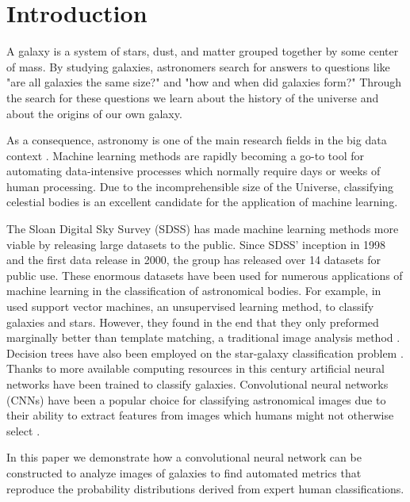 \section{Introduction}


A galaxy is a system of stars, dust, and matter grouped together by some center of mass. By studying galaxies, astronomers search for answers to questions like "are all galaxies the same size?" and "how and when did galaxies form?" Through the search for these questions we learn about the history of the universe and about the origins of our own galaxy.


As a consequence, astronomy is one of the main research fields in the big data context \cite{microsoft-galaxies}. Machine learning methods are rapidly becoming a go-to tool for automating data-intensive processes which normally require days or weeks of human processing. Due to the incomprehensible size of the Universe, classifying celestial bodies is an excellent candidate for the application of machine learning.

The Sloan Digital Sky Survey (SDSS) has made machine learning methods more viable by releasing large datasets to the public. Since SDSS' inception in 1998 and the first data release in 2000, the group has released over 14 datasets for public use. These enormous datasets have been used for numerous applications of machine learning in the classification of astronomical bodies. For example, \citeauthor{svn-galaxy} in \citeyear{svn-galaxy} used support vector machines, an unsupervised learning method, to classify galaxies and stars. However, they found in the end that they only preformed marginally better than template matching, a traditional image analysis method \cite{svn-galaxy}. Decision trees have also been employed on the star-galaxy classification problem \cite{ball-decision-trees}. Thanks to more available computing resources in this century artificial neural networks have been trained to classify galaxies. Convolutional neural networks (CNNs) have been a popular choice for classifying astronomical images due to their ability to extract features from images which humans might not otherwise select \cite{cnn-star-galaxy}.

In this paper we demonstrate how a convolutional neural network can be constructed to analyze images of galaxies to find automated metrics that reproduce the probability distributions derived from expert human classifications.

